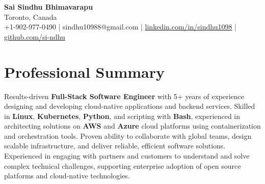 \documentclass[letterpaper,11pt]{article}
\begin{document}
\begin{center}
  {\Large \textbf{Sai Sindhu Bhimavarapu}} \\
  Toronto, Canada \\
  +1-902-977-0490 \enspace | \enspace sindhu10988@gmail.com \enspace | \enspace \href{https://www.linkedin.com/in/sindhu1098/}{linkedin.com/in/sindhu1098} \enspace | \enspace \href{https://github.com/si-ndhu}{github.com/si-ndhu}
\end{center}

\section{Professional Summary}
  \begin{itemize}[leftmargin=0.15in, label={}]
    \small{\item{
     Results-driven \textbf{Full-Stack Software Engineer} with 5+ years of experience designing and developing cloud-native applications and backend services. Skilled in \textbf{Linux}, \textbf{Kubernetes}, \textbf{Python}, and scripting with \textbf{Bash}, experienced in architecting solutions on \textbf{AWS} and \textbf{Azure} cloud platforms using containerization and orchestration tools. Proven ability to collaborate with global teams, design scalable infrastructure, and deliver reliable, efficient software solutions. Experienced in engaging with partners and customers to understand and solve complex technical challenges, supporting enterprise adoption of open source platforms and cloud-native technologies.
    }}
  \end{itemize}
\vspace{-16pt}

\end{document}
